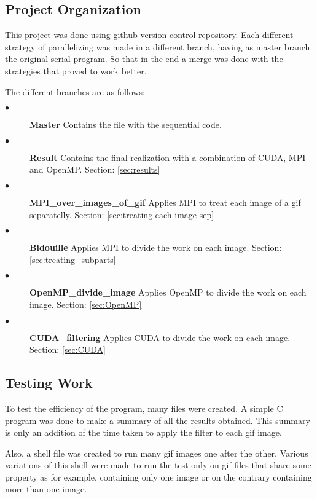\documentclass[conference,compsoc]{IEEEtran}
\begin{document}
\subsection{Project Organization}
This project was done using github version control repository. Each different strategy of parallelizing was made in a different branch, having as master branch the original serial program. So that in the end a merge was done with the strategies that proved to work better.

The different branches are as follows:
\begin{description}
	\item[$\bullet$] \textbf{Master} Contains the file with the sequential code.
	\item[$\bullet$] \textbf{Result} Contains the final realization with a combination of CUDA, MPI and OpenMP. Section: \ref{sec:results}
	\item[$\bullet$] \textbf{MPI\_over\_images\_of\_gif} Applies MPI to treat each image of a gif separatelly. Section: \ref{sec:treating-each-image-sep}
	\item[$\bullet$] \textbf{Bidouille} Applies MPI to divide the work on each image. Section: \ref{sec:treating_subparts}
	\item[$\bullet$] \textbf{OpenMP\_divide\_image} Applies OpenMP to divide the work on each image. Section: \ref{sec:OpenMP}
	\item[$\bullet$] \textbf{CUDA\_filtering} Applies CUDA to divide the work on each image. Section: \ref{sec:CUDA}
\end{description}


\subsection{Testing Work}
To test the efficiency of the program, many files were created. A simple C program was done to make a summary of all the results obtained. This summary is only an addition of the time taken to apply the filter to each gif image.


Also, a shell file was created to run many gif images one after the other. Various variations of this shell were made to run the test only on gif files that share some property as for example, containing only one image or on the contrary containing more than one image.
\end{document}
